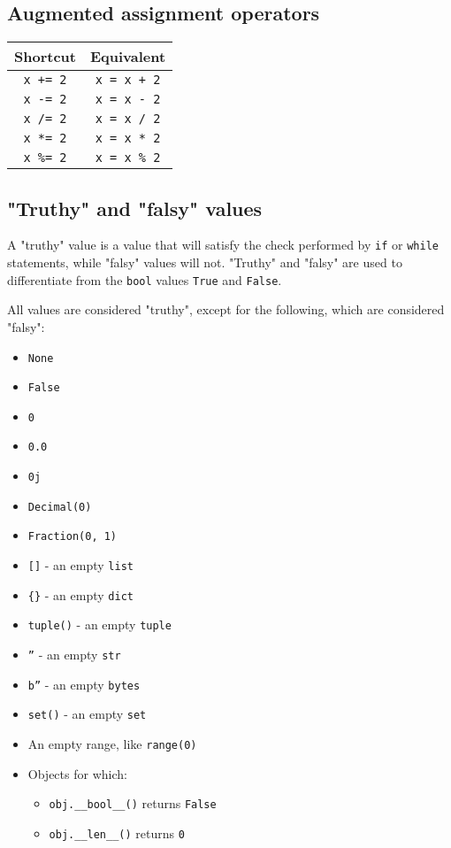 \documentclass[11pt]{article}
\begin{document}
\subsection{Augmented assignment operators}
\label{sec:org8471168}

\begin{center}
\begin{tabular}{c|c}
Shortcut & Equivalent\\
\hline
\texttt{x += 2} & \texttt{x = x + 2}\\
\texttt{x -= 2} & \texttt{x = x - 2}\\
\texttt{x /= 2} & \texttt{x = x / 2}\\
\texttt{x *= 2} & \texttt{x = x * 2}\\
\texttt{x \%= 2} & \texttt{x = x \% 2}\\
\end{tabular}
\end{center}

 \newpage
\subsection{"Truthy" and "falsy" values}
\label{sec:orgb5c743e}
\label{orgbe4ee6d}
A "truthy" value is a value that will satisfy the check performed by \texttt{if} or \texttt{while} statements, while "falsy" values will not. "Truthy" and "falsy" are used to differentiate from the \texttt{bool} values \texttt{True} and \texttt{False}.

 \noindent All values are considered "truthy", except for the following, which are considered "falsy":
\begin{itemize}
\item \texttt{None}
\item \texttt{False}
\item \texttt{0}
\item \texttt{0.0}
\item \texttt{0j}
\item \texttt{Decimal(0)}
\item \texttt{Fraction(0, 1)}
\item \texttt{[]} - an empty \texttt{list}
\item \texttt{\{\}} - an empty \texttt{dict}
\item \texttt{tuple()} - an empty \texttt{tuple}
\item \texttt{''} - an empty \texttt{str}
\item \texttt{b''} - an empty \texttt{bytes}
\item \texttt{set()} - an empty \texttt{set}
\item An empty range, like \texttt{range(0)}
\item Objects for which:
\begin{itemize}
\item \texttt{obj.\_\_bool\_\_()} returns \texttt{False}
\item \texttt{obj.\_\_len\_\_()} returns \texttt{0}
\end{itemize}
\end{itemize}
\end{document}
